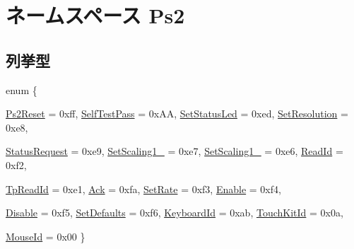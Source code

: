 \hypertarget{namespacePs2}{
\section{ネームスペース Ps2}
\label{namespacePs2}
}
\subsection*{列挙型}
\begin{DoxyCompactItemize}
\item 
enum \{ \par
\hyperlink{namespacePs2_ade9ca5088d171ad20b4c237f1c2d6260ab94340921dab0f119f136535b864513d}{Ps2Reset} =  0xff, 
\hyperlink{namespacePs2_ade9ca5088d171ad20b4c237f1c2d6260a14fc2df74316f5dd4e6f966fc51e957b}{SelfTestPass} =  0xAA, 
\hyperlink{namespacePs2_ade9ca5088d171ad20b4c237f1c2d6260a36f87d1c0c43c191f93d6de93b61c680}{SetStatusLed} =  0xed, 
\hyperlink{namespacePs2_ade9ca5088d171ad20b4c237f1c2d6260a1fa45c553056ac473f7d280e9f8b58e6}{SetResolution} =  0xe8, 
\par
\hyperlink{namespacePs2_ade9ca5088d171ad20b4c237f1c2d6260a9ba7da7cb05b70c6e69554c900798422}{StatusRequest} =  0xe9, 
\hyperlink{namespacePs2_ade9ca5088d171ad20b4c237f1c2d6260a169a1edb5a033b89d4fde46312a4a42e}{SetScaling1\_} =  0xe7, 
\hyperlink{namespacePs2_ade9ca5088d171ad20b4c237f1c2d6260ac4f02365c2c47cd955cdefd85b13cc5a}{SetScaling1\_} =  0xe6, 
\hyperlink{namespacePs2_ade9ca5088d171ad20b4c237f1c2d6260a8dedaaa85915ce30519ec1bed06c596f}{ReadId} =  0xf2, 
\par
\hyperlink{namespacePs2_ade9ca5088d171ad20b4c237f1c2d6260a527ad085e213273c22332f72e8cdf2c1}{TpReadId} =  0xe1, 
\hyperlink{namespacePs2_ade9ca5088d171ad20b4c237f1c2d6260a4d1dd807aba01d482342c0e103048b04}{Ack} =  0xfa, 
\hyperlink{namespacePs2_ade9ca5088d171ad20b4c237f1c2d6260aa2f456f6ee31b989e5858505c68c2c63}{SetRate} =  0xf3, 
\hyperlink{namespacePs2_ade9ca5088d171ad20b4c237f1c2d6260a80cb2080e90221d1f5b425387d9bd030}{Enable} =  0xf4, 
\par
\hyperlink{namespacePs2_ade9ca5088d171ad20b4c237f1c2d6260a9f306dd8981a103d6827f8b4e80da8aa}{Disable} =  0xf5, 
\hyperlink{namespacePs2_ade9ca5088d171ad20b4c237f1c2d6260a4ed94c0e613225a111a286b0479c5ced}{SetDefaults} =  0xf6, 
\hyperlink{namespacePs2_ade9ca5088d171ad20b4c237f1c2d6260a08d0dcb008b3033a86ab91e16e22c137}{KeyboardId} =  0xab, 
\hyperlink{namespacePs2_ade9ca5088d171ad20b4c237f1c2d6260a83431181d5117c65b1ee2d74705f3a24}{TouchKitId} =  0x0a, 
\par
\hyperlink{namespacePs2_ade9ca5088d171ad20b4c237f1c2d6260af70bb8bb050931a09933b9988efde622}{MouseId} =  0x00
 \}
\end{DoxyCompactItemize}
